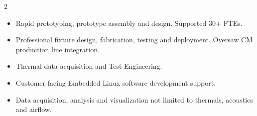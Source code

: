 \documentclass[10pt,a4paper,ragged2e,withhyper]{altacv}
\begin{document}
\begin{paracol}{2}
\begin{itemize}
\item Rapid prototyping, prototype assembly and design. Supported 30+ FTEs.
\item Professional fixture design, fabrication, testing and deployment. Oversaw CM production line integration. 
\item Thermal data acquisition and Test Engineering.
\item Customer facing Embedded Linux software development support.
\item Data acquisition, analysis and visualization not limited to thermals, acoustics and airflow.
\end{itemize}

\divider
{}
\break





\nocite{*}







\end{paracol}
\end{document}
